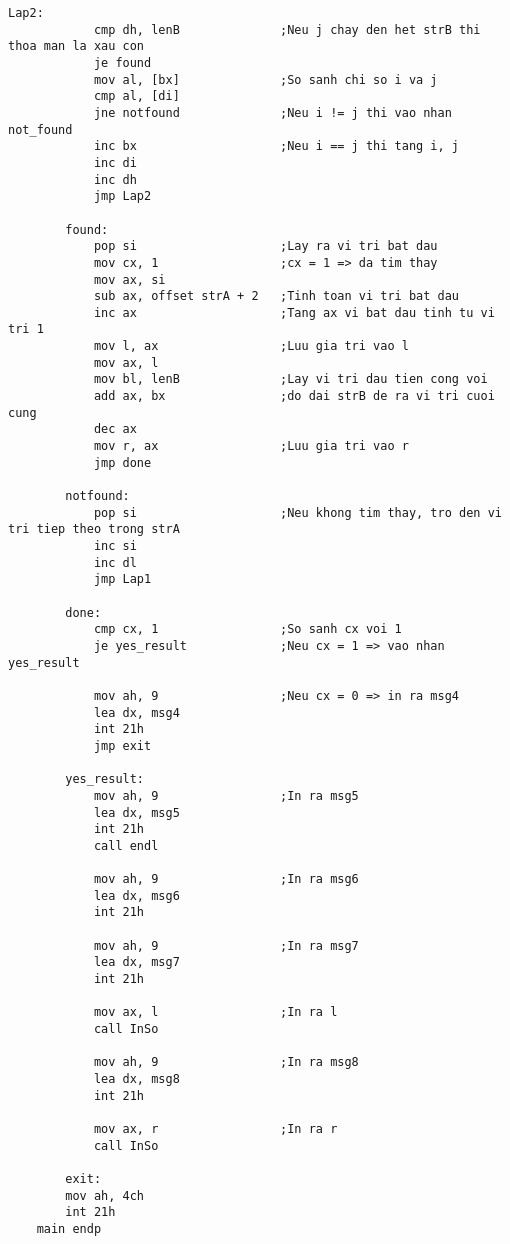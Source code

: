 \begin{lstlisting}[style=asm, caption={Mã nguồn câu 3}]
        Lap2:
            cmp dh, lenB              ;Neu j chay den het strB thi thoa man la xau con
            je found
            mov al, [bx]              ;So sanh chi so i va j
            cmp al, [di]
            jne notfound              ;Neu i != j thi vao nhan not_found
            inc bx                    ;Neu i == j thi tang i, j
            inc di
            inc dh
            jmp Lap2
        
        found:
            pop si                    ;Lay ra vi tri bat dau
            mov cx, 1                 ;cx = 1 => da tim thay
            mov ax, si
            sub ax, offset strA + 2   ;Tinh toan vi tri bat dau
            inc ax                    ;Tang ax vi bat dau tinh tu vi tri 1
            mov l, ax                 ;Luu gia tri vao l
            mov ax, l
            mov bl, lenB              ;Lay vi tri dau tien cong voi
            add ax, bx                ;do dai strB de ra vi tri cuoi cung
            dec ax
            mov r, ax                 ;Luu gia tri vao r
            jmp done
        
        notfound:
            pop si                    ;Neu khong tim thay, tro den vi tri tiep theo trong strA
            inc si
            inc dl
            jmp Lap1
        
        done:
            cmp cx, 1                 ;So sanh cx voi 1 
            je yes_result             ;Neu cx = 1 => vao nhan yes_result
        
            mov ah, 9                 ;Neu cx = 0 => in ra msg4
            lea dx, msg4
            int 21h
            jmp exit
        
        yes_result:
            mov ah, 9                 ;In ra msg5
            lea dx, msg5
            int 21h
            call endl
        
            mov ah, 9                 ;In ra msg6
            lea dx, msg6
            int 21h
        
            mov ah, 9                 ;In ra msg7
            lea dx, msg7
            int 21h
        
            mov ax, l                 ;In ra l
            call InSo
        
            mov ah, 9                 ;In ra msg8
            lea dx, msg8
            int 21h
        
            mov ax, r                 ;In ra r
            call InSo
        
        exit:
        mov ah, 4ch
        int 21h
    main endp
    

\end{lstlisting}
